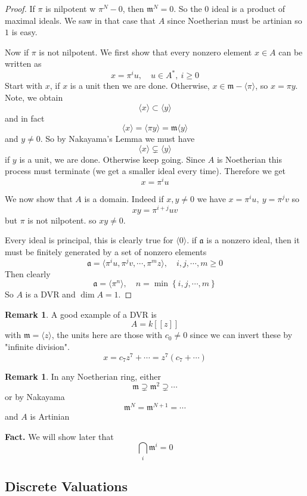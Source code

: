 \documentclass[11pt,a4paper]{article}
\theoremstyle{definition}
\newtheorem{remark}[definition]{Remark}
\theoremstyle{plain}
\theoremstyle{remark}
\renewcommand{\set}[1]{\left\{ #1 \right\}}
\newcommand{\angles}[1]{\langle #1 \rangle}
\begin{document}
\begin{proof}
    If $\pi$ is nilpotent w $\pi^N - 0$, then $\mathfrak{m}^N = 0$. So the $0$ ideal is a product of maximal ideals. We saw in that case that $A$ since Noetherian must be artinian 
    so $1$ is easy. 

    Now if $\pi$ is not nilpotent. We first show that every nonzero element $x \in A$ can be written as 
    $$x = \pi^i u, \quad u \in A^*, \ i \ge 0$$
    Start with $x$, if $x$ is a unit then we are done. Otherwise, $x \in \mathfrak{m} - \angles{\pi}$, so $x = \pi y$. Note, we obtain 
    $$\angles{x } \subset \angles{y}$$
    and in fact 
    $$\angles{x} = \angles{\pi y} = \mathfrak{m} \angles{y}$$
    and $y \ne 0$. So by Nakayama's Lemma we must have 
    $$\angles{x} \subsetneq \angles{y}$$
    if $y$ is a unit, we are done. Otherwise keep going. Since $A$ is Noetherian this process must terminate (we get a smaller ideal every time). Therefore we get 
    $$x = \pi^i u$$
    
    We now show that $A$ is a domain. Indeed if $x,y \ne 0$ we have $x = \pi^i u, \ y = \pi^j v$ so 
    $$xy = \pi^{i+j} uv$$
    but $\pi$ is not nilpotent. so $xy \ne 0$. 

    Every ideal is principal, this is clearly true for $\angles{0}$. if $\mathfrak{a}$ is a nonzero ideal, then it must be finitely generated by a set of nonzero elements 
    $$\mathfrak{a} = \angles{\pi^i u, \pi^j v, \cdots, \pi^m z}, \quad i,j,\cdots,m \ge 0$$
    Then clearly 
    $$\mathfrak{a} = \angles{\pi^n}, \quad n = \min \set{i,j,\cdots,m}$$
    So $A$ is a DVR and $\dim A = 1$.
\end{proof}

\begin{remark}
    A good example of a DVR is 
    $$A = k[[z]]$$
    with $\mathfrak{m} = \angles{z}$, the units here are those with $c_0 \ne 0$ since we can invert these by "infinite division".
    $$x = c_7 z^7 + \cdots = z^7 (c_7 + \cdots)$$
\end{remark}

\begin{remark}
    In any Noetherian ring, either
    $$\mathfrak{m} \supsetneq \mathfrak{m}^2 \supsetneq \cdots$$
    or by Nakayama
    $$\mathfrak{m}^N = \mathfrak{m}^{N+1} = \cdots$$
    and $A$ is Artinian
\end{remark}

\textbf{Fact.} We will show later that 
$$\bigcap_i \mathfrak{m}^i = 0$$

\subsection{Discrete Valuations} 
\end{document}
